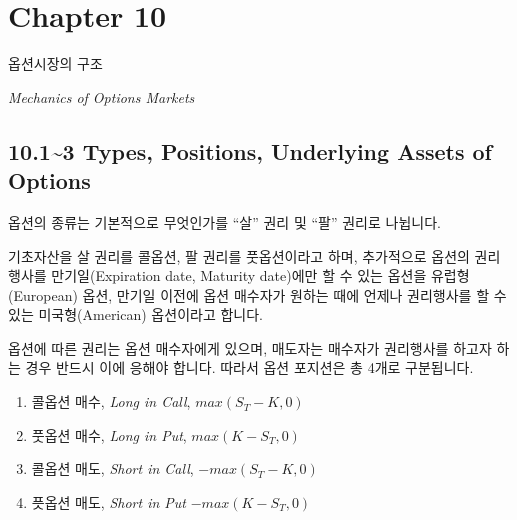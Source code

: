 \documentclass[
  letterpaper,
  DIV=11,
  numbers=noendperiod]{scrreprt}
\providecommand{\tightlist}{%
  \setlength{\itemsep}{0pt}\setlength{\parskip}{0pt}}\usepackage{longtable,booktabs,array}
\begin{document}
\chapter*{Chapter 10}\label{chapter-10}


옵션시장의 구조

\emph{Mechanics of Options Markets}

\section*{10.1\textasciitilde3 Types, Positions, Underlying Assets of
Options}\label{types-positions-underlying-assets-of-options}


옵션의 종류는 기본적으로 무엇인가를 ``살'' 권리 및 ``팔'' 권리로
나뉩니다.

기초자산을 살 권리를 콜옵션, 팔 권리를 풋옵션이라고 하며, 추가적으로
옵션의 권리행사를 만기일(Expiration date, Maturity date)에만 할 수 있는
옵션을 유럽형(European) 옵션, 만기일 이전에 옵션 매수자가 원하는 때에
언제나 권리행사를 할 수 있는 미국형(American) 옵션이라고 합니다.

옵션에 따른 권리는 옵션 매수자에게 있으며, 매도자는 매수자가 권리행사를
하고자 하는 경우 반드시 이에 응해야 합니다. 따라서 옵션 포지션은 총
4개로 구분됩니다.

\begin{enumerate}
\def\labelenumi{\arabic{enumi}.}
\tightlist
\item
  콜옵션 매수, \emph{Long in Call}, \(max(S_T-K,0)\)
\item
  풋옵션 매수, \emph{Long in Put}, \(max(K-S_T,0)\)
\item
  콜옵션 매도, \emph{Short in Call}, \(-max(S_T-K,0)\)
\item
  픗옵션 매도, \emph{Short in Put} \(-max(K-S_T,0)\)
\end{enumerate}
\end{document}
